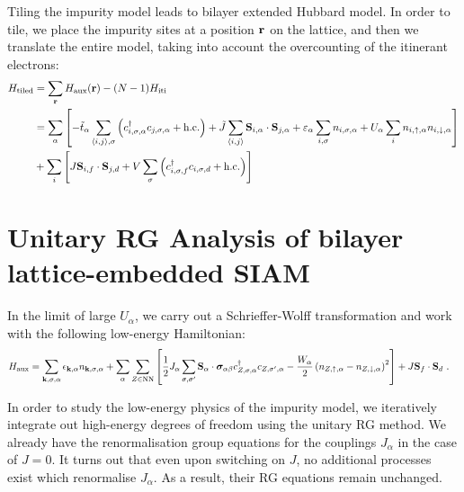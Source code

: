 \documentclass[%
reprint,
superscriptaddress,
groupedaddress,
superscriptaddress,
onecolumn,
10pt
]{revtex4-2}
\begin{document}
Tiling the impurity model leads to bilayer extended Hubbard model. In order to tile, we place the impurity sites at a position \({\bf r}\) on the lattice, and then we translate the entire model, taking into account the overcounting of the itinerant electrons:
\begin{equation}\begin{aligned}
	H_\text{tiled} &= \sum_{{\bf r}}H_\text{aux}({\bf r}) - (N-1) H_\text{iti} \\
	&= \sum_\alpha\left[-\tilde t_\alpha\sum_{\braket{i,j},\sigma}\left(c^\dagger_{i,\sigma,\alpha}c_{j,\sigma,\alpha} + \text{h.c.}\right) + \tilde J \sum_{\braket{i,j}}{\bf S}_{i,\alpha} \cdot {\bf S}_{j,\alpha} + \varepsilon_\alpha \sum_{i,\sigma}n_{i,\sigma,\alpha} + U_\alpha \sum_i n_{i,\uparrow,\alpha}n_{i,\downarrow,\alpha} \right] \\
	 &+ \sum_i \left[J {\bf S}_{i,f} \cdot {\bf S}_{j,d} + V\sum_\sigma\left(c^\dagger_{i,\sigma,f}c_{i,\sigma,d} + \text{h.c.}\right) \right]	
\end{aligned}\end{equation}

\section{Unitary RG Analysis of bilayer lattice-embedded SIAM}
In the limit of large \(U_\alpha\), we carry out a Schrieffer-Wolff transformation and work with the following low-energy Hamiltonian:
\begin{equation}\begin{aligned}
	H_\text{aux} &= \sum_{{\bf k},\sigma,\alpha}\epsilon_{{\bf k},\alpha}n_{{\bf k},\sigma,\alpha} + \sum_\alpha\sum_{Z \in \text{NN}}\left[\frac{1}{2}J_\alpha\sum_{\sigma,\sigma^\prime}{\bf S}_\alpha \cdot {\boldsymbol{\sigma}}_{\alpha\beta}c^\dagger_{Z,\sigma,\alpha}c_{Z,\sigma^\prime,\alpha} - \frac{W_\alpha}{2} \left(n_{Z,\uparrow,\alpha} - n_{Z,\downarrow,\alpha}\right)^2\right] + J{\bf S}_f \cdot {\bf S}_d~.
\end{aligned}\end{equation}

In order to study the low-energy physics of the impurity model, we iteratively integrate out high-energy degrees of freedom using the unitary RG method. We already have the renormalisation group equations for the couplings \(J_\alpha\) in the case of \(J=0\). It turns out that even upon switching on \(J\), no additional processes exist which renormalise \(J_\alpha\). As a result, their RG equations remain unchanged.
\end{document}
